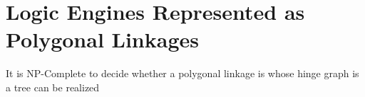 

\section{Logic Engines Represented as Polygonal Linkages}
\begin{thm}
 It is NP-Complete to decide whether a polygonal linkage is whose hinge graph is a tree can be 
realized
\end{thm}

